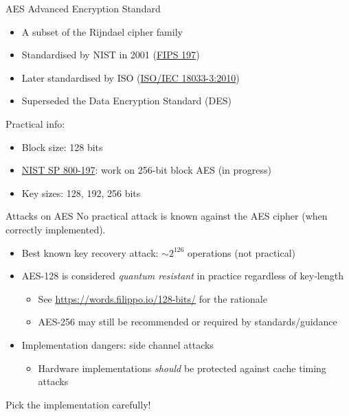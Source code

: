 \begin{frame}{AES}
  Advanced Encryption Standard
  \pause
  \begin{itemize}
    \item A subset of the Rijndael cipher family
    \item Standardised by NIST in 2001 (\href{https://csrc.nist.gov/pubs/fips/197/final}{FIPS 197})
    \item Later standardised by ISO (\href{https://www.iso.org/standard/54531.html}{ISO/IEC 18033-3:2010})
    \item Superseded the Data Encryption Standard (DES)
  \end{itemize}

  \pause
  Practical info:
  \begin{itemize}[<+(1)->]
    \item Block size: 128 bits
    \item \href{https://csrc.nist.gov/pubs/sp/800/197/iprd}{NIST SP 800-197}: work on 256-bit block AES (in progress)
    \item Key sizes: 128, 192, 256 bits
  \end{itemize}
\end{frame}

\begin{frame}{Attacks on AES}
  No practical attack is known against the AES cipher (when correctly implemented).

  \begin{itemize}[<+(1)->]
    \item Best known key recovery attack: $\sim 2^{126}$ operations (not practical)
    \item AES-128 is considered \emph{quantum resistant} in practice regardless of key-length
    \par
    \begin{itemize}
      \item See {\footnotesize\url{https://words.filippo.io/128-bits/}} for the rationale
      \item AES-256 may still be recommended or required by standards/guidance
    \end{itemize}
    \item Implementation dangers: side channel attacks
    \par
    \begin{itemize}
      \item Hardware implementations \emph{should} be protected against cache timing attacks
    \end{itemize}
  \end{itemize}

  \pause
  Pick the implementation carefully!
\end{frame}

